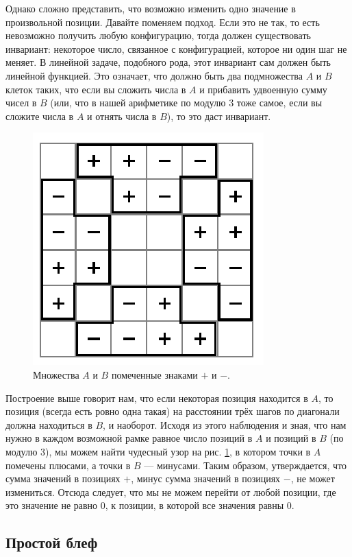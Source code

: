 Однако сложно представить, что возможно изменить одно значение в произвольной позиции.
Давайте поменяем подход.
Если это не так, то есть невозможно получить любую конфигурацию, тогда должен существовать инвариант: некоторое число, связанное с конфигурацией, которое ни один шаг не меняет.
В линейной задаче, подобного рода, этот инвариант сам должен быть линейной функцией.
Это означает, что должно быть два подмножества $A$ и $B$ клеток таких, что если вы сложить числа в $A$ и прибавить удвоенную сумму чисел в $B$ (или, что в нашей арифметике по модулю $3$ тоже самое, если вы сложите числа в $A$ и отнять числа в $B$), то это даст инвариант.

\begin{figure}[t!]
\centering
\includegraphics[scale=1]{pics/chess2}
\caption{Множества $A$ и $B$ помеченные знаками $+$ и $-$.}
\label{pic:chess2}
\end{figure}

Построение выше говорит нам, что если некоторая позиция находится в $A$, то позиция (всегда есть ровно одна такая) на расстоянии трёх шагов по диагонали должна находиться в $B$, и наоборот.
Исходя из этого наблюдения и зная, что нам нужно в каждом возможной рамке равное число позиций в $A$ и позиций в $B$ (по модулю 3), мы можем найти чудесный узор на рис. \ref{pic:chess2}, в котором точки в $A$ помечены плюсами, а точки в $B$ --- минусами.
Таким образом, утверждается, что сумма значений в позициях $+$, минус сумма значений в позициях $-$, не может измениться.
Отсюда следует, что мы не можем перейти от любой позиции, где это значение не равно $0$, к позиции, в которой все значения равны $0$.

\subsection*{Простой блеф}

